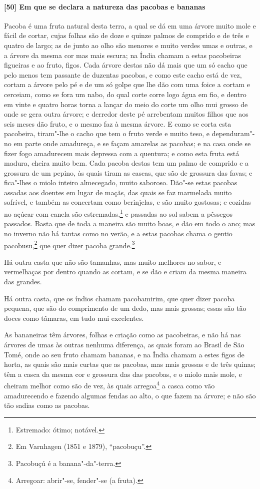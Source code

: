 \paragraph{[50] Em que se declara a natureza das pacobas e bananas}\quad
\mbox{Pacoba} é uma fruta natural desta terra, a qual se dá em uma árvore muito mole e fácil de
cortar, cujas folhas são de doze e quinze palmos de comprido e de três e quatro de largo;
as de junto ao olho são menores e muito verdes umas e outras, e a árvore da mesma cor mas
mais escura; na Índia chamam a estas pacobeiras figueiras e ao fruto, figos. Cada árvore
destas não dá mais que um só cacho que pelo menos tem passante de duzentas pacobas, e como
este cacho está de vez, cortam a árvore pelo pé e de um só golpe que lhe dão com uma foice
a cortam e cerceiam, como se fora um nabo, do qual corte corre logo água em fio, e dentro
em vinte e quatro horas torna a lançar do meio do corte um olho mui grosso de onde se gera
outra árvore; e derredor deste pé arrebentam muitos filhos que aos seis meses dão fruto, e
o mesmo faz à mesma árvore. E como se corta esta pacobeira, tiram"-lhe o cacho que tem o
fruto verde e muito teso, e dependuram"-no em parte onde amadureça, e se façam amarelas as
pacobas; e na casa onde se fizer fogo amadurecem mais depressa com a quentura; e como esta
fruta está madura, cheira muito bem. Cada pacoba destas tem um palmo de comprido e a
grossura de um pepino, às quais tiram as cascas, que são de grossura das favas; e
fica"-lhes o miolo inteiro almecegado, muito saboroso. Dão"-se estas pacobas assadas aos
doentes em lugar de maçãs, das quais se faz marmelada muito sofrível, e também as
concertam como berinjelas, e são muito gostosas; e cozidas no açúcar com canela são
estremadas,\footnote{ Estremado: ótimo; notável.} e passadas ao sol sabem a pêssegos
passados. Basta que de toda a maneira são muito boas, e dão em todo o ano; mas no inverno
não há tantas como no verão, e a estas pacobas chama o gentio pacobusu,\footnote{ Em
Varnhagen (1851 e 1879), ``pacobuçu''.} que quer dizer pacoba grande.\footnote{ Pacobuçú é
a banana"-da"-terra.}

Há outra casta que não são tamanhas, mas muito melhores no sabor, e vermelhaças por dentro
quando as cortam, e se dão e criam da mesma maneira das grandes.

Há outra casta, que os índios chamam pacobamirim, que quer dizer pacoba pequena, que são
do comprimento de um dedo, mas mais grossas; essas são tão doces como tâmaras, em tudo mui
excelentes.

As bananeiras têm árvores, folhas e criação como as pacobeiras, e não há nas árvores de
umas às outras nenhuma diferença, as quais foram ao Brasil de São Tomé, onde ao seu fruto
chamam bananas, e na Índia chamam a estes figos de horta, as quais são mais curtas que as
pacobas, mas mais grossas e de três quinas; têm a casca da mesma cor e grossura das das
pacobas, e o miolo mais mole, e cheiram melhor como são de vez, às quais arregoa\footnote{
Arregoar: abrir"-se, fender"-se (a fruta).} a casca como vão amadurecendo e fazendo algumas
fendas ao alto, o que fazem na árvore; e não são tão sadias como as pacobas.

